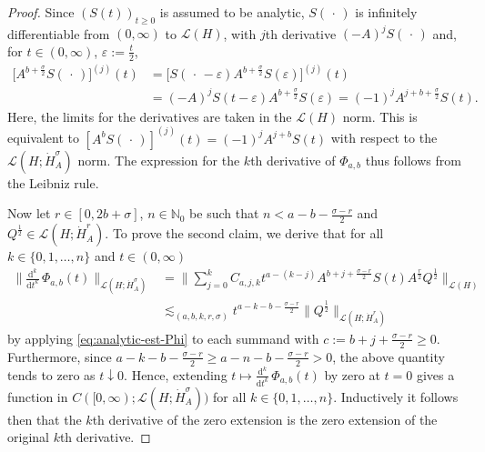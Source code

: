 \documentclass[reqno]{amsart}
\numberwithin{equation}{section}
\newcommand{\N}{\mathbb{N}}
\newcommand{\Hdot}[1]{\dot{H}^{#1}_A}
\theoremstyle{remark}
\theoremstyle{definition}
\begin{document}
\begin{proof}
	Since $(S(t))_{t\ge0}$ is assumed
	to be analytic, 
	$S(\,\cdot\,)$ is infinitely differentiable
	from $(0,\infty)$ 
	to $\mathscr L(H)$,
	with $j$th derivative $(-A)^j S(\,\cdot\,)$ and, 
	for $t \in (0,\infty)$, $\varepsilon := \frac{t}{2}$, 
	\begin{align*}
	\bigl[ A^{ b + \frac{\sigma}{2} } S(\,\cdot\,) \bigr]^{(j)}(t) 
	&= 
	\bigl[ S( \,\cdot\, - \varepsilon) A^{ b+ \frac{\sigma}{2} } 
	S( \varepsilon ) \bigr]^{(j)}(t) 
	\\ 
	&= 
	(-A)^j S(t-\varepsilon) A^{ b + \frac{\sigma}{2} } S(\varepsilon)  
	= 
	(-1)^j A^{ j + b + \frac{\sigma}{2} } S(t).  
	\end{align*}
	Here, the limits for the derivatives 
	are taken in the $\mathscr L(H)$ norm. 
	This is equivalent to  
	$[ A^b S(\,\cdot\,) ]^{(j)}(t) 
	= (-1)^j A^{j+b} S(t)$
	with respect to the 
	$\mathscr L(H;\dot H_A^\sigma)$ norm. 
	The expression 
	for the $k$th derivative of $\Phi_{a,b}$ 
	thus follows from the Leibniz rule. 
	
	Now let 
	$r\in[0, 2b+\sigma ]$, 
	$n\in\N_0$ be such that $n < a-b-\frac{\sigma-r}{2}$ and 
	$Q^{\frac{1}{2}} \in \mathscr L(H;\dot H_A^r)$. 
	To prove the second claim, 
	we derive that for all $k \in \{0,1,\dots,n\}$ 
	and $t \in (0,\infty)$
	\begin{align*} 
	\biggl\| 
	\frac{\mathrm d^k}{\mathrm d t^k} \, 
	\Phi_{a,b} (t) 
	\biggr\|_{\mathscr L(H;\Hdot\sigma)} 
	&= 
	\biggl\| 
	\sum_{j=0}^k C_{a,j,k} t^{a -(k-j)} 
	A^{b+j+\frac{\sigma-r}{2}} S(t) A^{\frac{r}{2}} Q^\frac{1}{2} 
	\biggr\|_{\mathscr L(H)} 
	\\
	&\lesssim_{(a,b,k,r,\sigma)} 
	t^{a-k-b-\frac{\sigma-r}{2}}  
	\bigl\| Q^{\frac{1}{2}} \bigr\|_{\mathscr L(H; \dot H_A^r)} 
	\end{align*} 
	by 
	applying \eqref{eq:analytic-est-Phi} to each summand 
	with $c:=b+j+\frac{\sigma-r}{2}\geq 0$. 
	Furthermore, since 
	$a-k-b-\frac{\sigma-r}{2}\geq a-n-b-\frac{\sigma-r}{2}>0$, 
	the above quantity tends to zero as $t \downarrow 0$. 
	Hence, extending 
	$t\mapsto \frac{\mathrm d^k}{\mathrm d t^k} \, \Phi_{a,b}(t)$ 
	by zero at $t=0$  
	gives a function in $C([0,\infty); \mathscr L(H; \Hdot\sigma))$ 
	for all $k \in \{0,1,\dots,n\}$. 
	Inductively 
	it follows then 
	that the $k$th derivative of the zero extension is 
	the zero extension of the original $k$th derivative. 
\end{proof}
\end{document}
